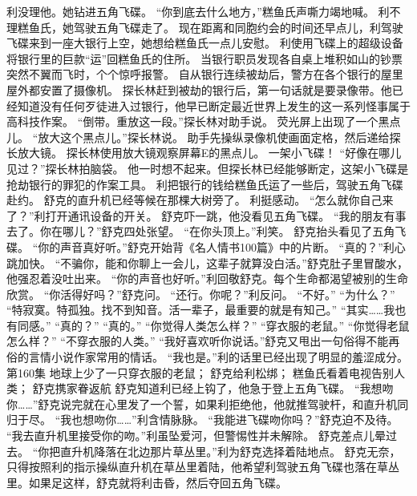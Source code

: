 \documentclass[a4paper,12pt,UTF8,twoside]{ctexbook}
\begin{document}
        利没理他。她钻进五角飞碟。 
        “你到底去什么地方，”糕鱼氏声嘶力竭地喊。 
        利不理糕鱼氏，她驾驶五角飞碟走了。 
        现在距离和同胞约会的时间还早点儿，利驾驶飞碟来到一座大银行上空，她想给糕鱼氏一点儿安慰。 
        利使用飞碟上的超级设备将银行里的巨款“运”回糕鱼氏的住所。 
        当银行职员发现各自桌上堆积如山的钞票突然不翼而飞时，个个惊呼报警。 
        自从银行连续被劫后，警方在各个银行的屋里屋外都安置了摄像机。 
        探长林赶到被劫的银行后，第一句话就是要录像带。他已经知道没有任何歹徒进入过银行，他早已断定最近世界上发生的这一系列怪事属于高科技作案。 
        “倒带。重放这一段。”探长林对助手说。 
        荧光屏上出现了一个黑点儿。 
        “放大这个黑点儿。”探长林说。 
        助手先操纵录像机使画面定格，然后递给探长放大镜。 
        探长林使用放大镜观察屏幕E的黑点儿。 
        一架小飞碟！ 
        “好像在哪儿见过？”探长林拍脑袋。 
        他一时想不起来。但探长林已经能够断定，这架小飞碟是抢劫银行的罪犯的作案工具。 
        利把银行的钱给糕鱼氏运了一些后，驾驶五角飞碟赴约。 
        舒克的直升机已经等候在那棵大树旁了。 
        利挺感动。 
        “怎么就你自己来了？”利打开通讯设备的开关。 
        舒克吓一跳，他没看见五角飞碟。 
        “我的朋友有事去了。你在哪儿？”舒克四处张望。 
        “在你头顶上。”利笑。 
        舒克抬头看见了五角飞碟。 
        “你的声音真好听。”舒克开始背《名人情书100篇》中的片断。 
        “真的？”利心跳加快。 
        “不骗你，能和你聊上一会儿，这辈子就算没白活。”舒克肚子里冒酸水，他强忍着没吐出来。 
        “你的声音也好听。”利回敬舒克。每个生命都渴望被别的生命欣赏。 
        “你活得好吗？”舒克问。 
        “还行。你呢？”利反问。 
        “不好。” 
        “为什么？” 
        “特寂寞。特孤独。找不到知音。活一辈子，最重要的就是有知己。” 
        “其实……我也有同感。” 
        “真的？” 
        “真的。” 
        “你觉得人类怎么样？” 
        “穿衣服的老鼠。” 
        “你觉得老鼠怎么样？” 
        “不穿衣服的人类。” 
        “我好喜欢听你说话。”舒克又甩出一句俗得不能再俗的言情小说作家常用的情话。 
        “我也是。”利的话里已经出现了明显的羞涩成分。   第160集 
        地球上少了一只穿衣服的老鼠； 
        舒克给利松绑； 
        糕鱼氏看着电视告别人类； 
        舒克携家眷返航   
        舒克知道利已经上钩了，他急于登上五角飞碟。 
        “我想吻你……”舒克说完就在心里发了一个誓，如果利拒绝他，他就推驾驶杆，和直升机同归于尽。 
        “我也想吻你……”利含情脉脉。 
        “我能进飞碟吻你吗？”舒克迫不及待。 
        “我去直升机里接受你的吻。”利虽坠爱河，但警惕性并未解除。 
        舒克差点儿晕过去。 
        “你把直升机降落在北边那片草丛里。”利为舒克选择着陆地点。 
        舒克无奈，只得按照利的指示操纵直升机在草丛里着陆，他希望利驾驶五角飞碟也落在草丛里。如果足这样，舒克就将利击昏，然后夺回五角飞碟。 
\end{document}
